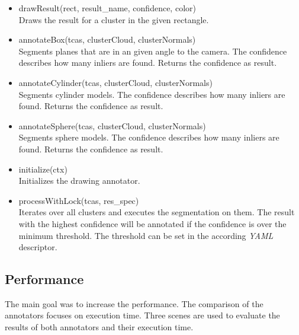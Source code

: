 \documentclass[main.tex]{subfiles}
\begin{document}
\begin{itemize}
\item drawResult(rect, result\_name, confidence, color)\\
Draws the result for a cluster in the given rectangle.

\item annotateBox(tcas, clusterCloud, clusterNormals)\\
Segments planes that are in an given angle to the camera. The confidence describes how many inliers are found. Returns the confidence as result.

\item annotateCylinder(tcas, clusterCloud, clusterNormals)\\
Segments cylinder models. The confidence describes how many inliers are found. Returns the confidence as result.

\item annotateSphere(tcas, clusterCloud, clusterNormals)\\
Segments sphere models. The confidence describes how many inliers are found. Returns the confidence as result.

\item initialize(ctx)\\
Initializes the drawing annotator.

\item processWithLock(tcas, res\_spec)\\
Iterates over all clusters and executes the segmentation on them. The result with the highest confidence will be annotated if
the confidence is over the minimum threshold. The threshold can be set in the according \textit{YAML} descriptor.
\end{itemize}

\subsection{Performance}
The main goal was to increase the performance. The comparison of the annotators focuses on execution time.
Three scenes are used to evaluate the results of both annotators and their execution time.
\end{document}
